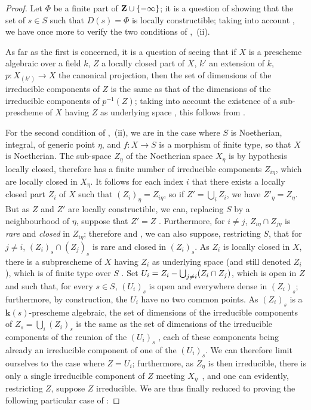 \begin{proof}
Let $\Phi$ be a finite part of $\mathbf{Z}\cup\{-\infty\}$; it is a question of showing that the set of $s\in S$ such that $D(s)=\Phi$ is locally constructible; taking into account , we have once more to verify the two conditions of ,~(ii).

As far as the first is concerned, it is a question of seeing that if $X$ is a prescheme algebraic over a field $k$, $Z$ a locally closed part of $X$, $k'$ an extension of $k$, $p:X_{(k')}\to X$ the canonical projection, then the set of dimensions of the irreducible components of $Z$ is the same as that of the dimensions of the irreducible components of $p^{-1}(Z)$; taking into account the existence of a sub-prescheme of $X$ having $Z$ as underlying space , this follows from .

For the second condition of ,~(ii), we are in the case where $S$ is Noetherian, integral, of generic point $\eta$, and $f:X\to S$ is a morphism of finite type, so that $X$ is Noetherian.
The sub-space $Z_\eta$ of the Noetherian space $X_\eta$ is by hypothesis locally closed, therefore has a finite number of irreducible components $Z_{i\eta}$, which are locally closed in $X_\eta$.
It follows for each index $i$ that there exists a locally closed part $Z_i$ of $X$ such that $(Z_i)_\eta=Z_{i\eta}$, so if $Z'=\bigcup_i Z_i$, we have $Z'_\eta=Z_\eta$.
But as $Z$ and $Z'$ are locally constructible, we can, replacing $S$ by a neighbourhood of $\eta$, suppose that $Z'=Z$ .
Furthermore, for $i\neq j$, $Z_{i\eta}\cap Z_{j\eta}$ is \emph{rare} and \emph{closed} in $Z_{i\eta}$; therefore  and , we can also suppose, restricting $S$, that for $j\neq i$, $(Z_i)_s\cap(Z_j)_s$ is rare and closed in $(Z_i)_s$.
As $Z_i$ is locally closed in $X$, there is a subprescheme of $X$ having $Z_i$ as underlying space (and still denoted $Z_i$), which is of finite type over $S$ .
Set $U_i=Z_i-\bigcup_{j\neq i}(Z_i\cap Z_j)$, which is open in $Z$ and such that, for every $s\in S$, $(U_i)_s$ is open and everywhere dense in $(Z_i)_s$; furthermore, by construction, the $U_i$ have no two common points.
As $(Z_i)_s$ is a $\boldsymbol{k}(s)$-prescheme algebraic, the set of dimensions of the irreducible components of $Z_s=\bigcup_i(Z_i)_s$ is the same as the set of dimensions of the irreducible components of the reunion of the $(U_i)_s$ , each of these components being already an irreducible component of one of the $(U_i)_s$.
We can therefore limit ourselves to the case where $Z=U_i$; furthermore, as $Z_\eta$ is then irreducible, there is only a single irreducible component of $Z$ meeting $X_\eta$~, and one can evidently, restricting $Z$, suppose $Z$ irreducible.
We are thus finally reduced to proving the following particular case of :
\end{proof}

